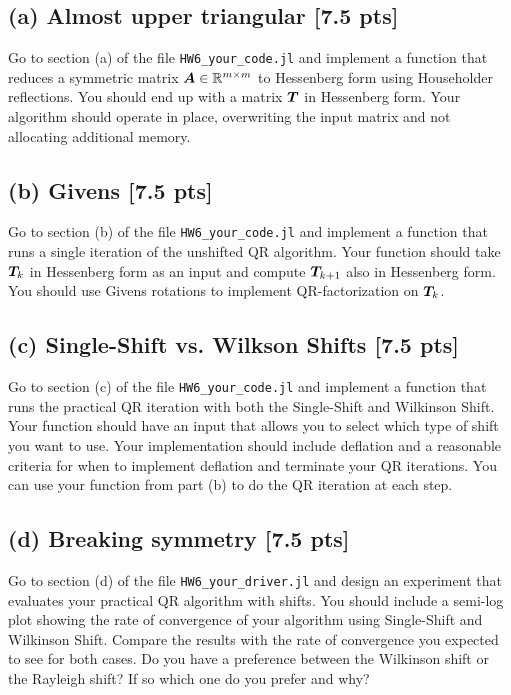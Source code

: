 \documentclass[twoside,10pt]{article}
\begin{document}
\subsection*{(a) Almost upper triangular [7.5 pts]} 
Go to section (a) of the file \texttt{HW6\_your\_code.jl} and implement a function that reduces a symmetric matrix $\bm{A} \in \mathbb{R}^{m\times m}$ to Hessenberg form using Householder reflections. You should end up with a matrix $\bm{T}$ in Hessenberg form. Your algorithm should operate in place, overwriting the input matrix and not allocating additional memory. 

\subsection*{(b) Givens [7.5 pts]} 
Go to section (b) of the file \texttt{HW6\_your\_code.jl} and implement a function that runs a single iteration of the unshifted QR algorithm. Your function should take $\bm{T}_{k}$ in Hessenberg form as an input and compute $\bm{T}_{k+1}$ also in Hessenberg form. You should use Givens rotations to implement QR-factorization on $\bm{T}_{k}$.

\subsection*{(c) Single-Shift vs. Wilkson Shifts [7.5 pts]}
Go to section (c) of the file \texttt{HW6\_your\_code.jl} and implement a function that runs the practical QR iteration with both the Single-Shift and Wilkinson Shift. Your function should have an input that allows you to select which type of shift you want to use.  Your implementation should include deflation and a reasonable criteria for when to implement deflation and terminate your QR iterations. You can use your function from part (b) to do the QR iteration at each step.

\subsection*{(d) Breaking symmetry [7.5 pts]}
Go to section (d) of the file \texttt{HW6\_your\_driver.jl} and design an experiment that evaluates your practical QR algorithm with shifts. You should include a semi-log plot showing the rate of convergence of your algorithm using Single-Shift and Wilkinson Shift. Compare the results with the rate of convergence you expected to see for both cases. Do you have a preference between the Wilkinson shift or the Rayleigh shift?  If so which one do you prefer and why?
\end{document}
